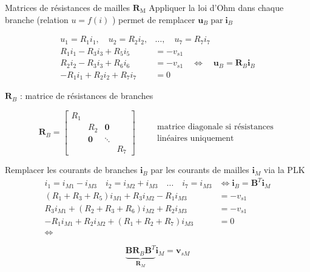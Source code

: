 \begin{frame}{Matrices de résistances de mailles $\mathbf{R}_{\mathrm{M}}$}
Appliquer la loi d'Ohm dans chaque branche (relation $u=f(i)$ ) permet de remplacer $\mathbf{u}_{B} \operatorname{par} \mathbf{i}_{B}$

$$
\begin{aligned}
u_{1}=R_{1} i_{1}, \quad u_{2}=R_{2} i_{2}, & \ldots, \quad u_{7}=R_{7} i_{7} \\
R_{1} i_{1}-R_{3} i_{3}+R_{5} i_{5} & =-v_{s 1} \\
R_{2} i_{2}-R_{3} i_{3}+R_{6} i_{6} & =-v_{s 1} \quad \Longleftrightarrow \quad \mathbf{u}_{B}=\mathbf{R}_{B} \mathbf{i}_{B} \\
-R_{1} i_{1}+R_{2} i_{2}+R_{7} i_{7} & =0
\end{aligned}
$$

$\mathbf{R}_{B}$ : matrice de résistances de branches

$$
\mathbf{R}_{B}=\left[\begin{array}{cccc}
R_{1} & & & \\
& R_{2} & \mathbf{0} & \\
& \mathbf{0} & \ddots & \\
& & & R_{7}
\end{array}\right] \quad \begin{aligned}
& \text { matrice diagonale si résistances} \\
& \text { linéaires uniquement }
\end{aligned}
$$
\end{frame}

\begin{frame}{Remplacer les courants de branches $\mathbf{i}_{B}$ par les courants de mailles $\mathbf{i}_{M}$ via la PLK}
$$
\begin{aligned}
i_{1}=i_{M 1}-i_{M 3} \quad i_{2}=i_{M 2}+i_{M 3} \quad \ldots \quad i_{7}=i_{M 3} & \Longleftrightarrow \mathbf{i}_{B}=\mathbf{B}^{T} \mathbf{i}_{M} \\
\left(R_{1}+R_{3}+R_{5}\right) i_{M 1}+R_{3} i_{M 2}-R_{1} i_{M 3} & =-v_{s 1} \\
R_{3} i_{M 1}+\left(R_{2}+R_{3}+R_{6}\right) i_{M 2}+R_{2} i_{M 3} & =-v_{s 1} \\
-R_{1} i_{M 1}+R_{2} i_{M 2}+\left(R_{1}+R_{2}+R_{7}\right) i_{M 3} & =0 \\
\Longleftrightarrow &
\end{aligned}
$$

$$
\underbrace{\mathbf{B R}_{B} \mathbf{B}^{T}}_{\mathbf{R}_{M}} \mathbf{i}_{M}=\mathbf{v}_{s M}
$$

\end{frame}

